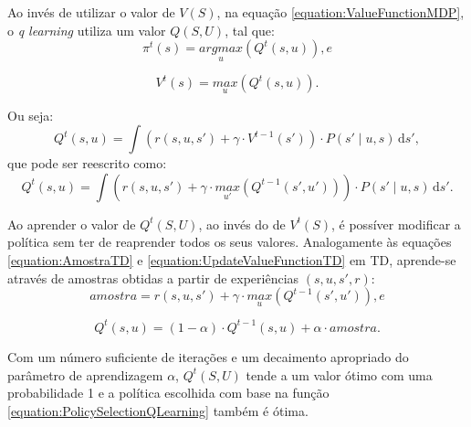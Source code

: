 Ao invés de utilizar o valor de $ V \left( S \right) $, na equação \ref{equation:ValueFunctionMDP}, o \textit{q learning} utiliza um valor $ Q \left( S, U \right) $, tal que:
\begin{equation} \label{equation:PolicySelectionQLearning}
    \pi^t \left( s \right) = \underset{u}{argmax} \left( Q^t \left( s, u \right) \right), e
\end{equation}

\begin{equation}
    V^t \left( s \right) = \underset{u}{max} \left( Q^t \left( s, u \right) \right).
\end{equation}

Ou seja:
\begin{equation} \label{equation:QValueFunctionQLearning}
    Q^t \left( s, u \right) = \int \! \left( r \left( s, u, s' \right) + \gamma \cdot V^{t-1} \left( s' \right) \right) \cdot P \left( s' \mid u, s \right) \, \mathrm{d}s',
\end{equation}
que pode ser reescrito como:
\begin{equation} \label{equation:QValueFunctionQLearningFinal}
    Q^t \left( s, u \right) = \int \! \left( r \left( s, u, s' \right) + \gamma \cdot \underset{u'}{max} \left( Q^{t-1} \left( s', u' \right) \right) \right) \cdot P \left( s' \mid u, s \right) \, \mathrm{d}s'.
\end{equation}

Ao aprender o valor de $ Q^t \left( S, U \right) $, ao invés do de $ V^t \left( S \right) $, é possíver modificar a política sem ter de reaprender todos os seus valores. Analogamente às equações \ref{equation:AmostraTD} e \ref{equation:UpdateValueFunctionTD} em TD, aprende-se através de amostras obtidas a partir de experiências $ \left( s, u, s', r \right) $:
\begin{equation} \label{equation:AmostraQLearning}
	amostra = r \left( s, u, s' \right) + \gamma \cdot \underset{u}{max} \left( Q^{t-1} \left( s', u' \right) \right), e
\end{equation}

\begin{equation} \label{equation:QUpdateQLearning}
	Q^t \left( s, u \right) = \left( 1 - \alpha \right) \cdot Q^{t-1} \left( s, u \right) + \alpha \cdot amostra.
\end{equation}

Com um número suficiente de iterações e um decaimento apropriado do parâmetro de aprendizagem $ \alpha $, $ Q^t \left( S, U \right) $ tende a um valor ótimo  com uma probabilidade 1 \cite{journals:ml:Tsitsiklis94,Jaakkola94convergenceof,Watkins:1989} e a política escolhida com base na função \ref{equation:PolicySelectionQLearning} também é ótima.

